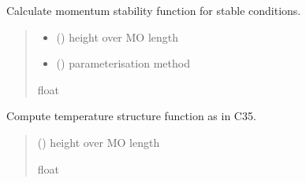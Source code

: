 \documentclass[letterpaper,10pt,english]{sphinxmanual}
\begin{document}

\begin{fulllineitems}
\label{\detokenize{users_guide:AirSeaFluxCode.flux_subs.stratification.psim_stab}}
\pysigstartsignatures
\pysiglinewithargsret
{}
{\sphinxparamcomma {}}
{}
\pysigstopsignatures
\sphinxAtStartPar
Calculate momentum stability function for stable conditions.
\begin{quote}\begin{description}
\begin{itemize}
\item {}
\sphinxAtStartPar
{} () \textendash{} height over MO length

\item {}
\sphinxAtStartPar
{} () \textendash{} parameterisation method

\end{itemize}

\sphinxAtStartPar
{}

\sphinxAtStartPar
float

\end{description}\end{quote}

\end{fulllineitems}


\begin{fulllineitems}
\label{\detokenize{users_guide:AirSeaFluxCode.flux_subs.stratification.psit_26}}
\pysigstartsignatures
\pysiglinewithargsret
{}
{}
{}
\pysigstopsignatures
\sphinxAtStartPar
Compute temperature structure function as in C35.
\begin{quote}\begin{description}
\sphinxAtStartPar
{} () \textendash{} height over MO length

\sphinxAtStartPar
{}

\sphinxAtStartPar
float

\end{description}\end{quote}

\end{fulllineitems}
\end{document}
